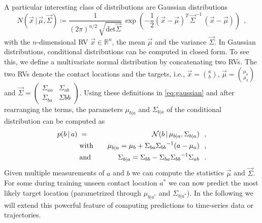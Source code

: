 A particular interesting class of distributions are Gaussian distributions 
\begin{equation}\label{eq:gaussian}
 N(\vec x \, | \, \vec \mu, \vec \Sigma) \coloneqq \frac{1}{{(2\pi)}^{n/2} \, \sqrt{\textrm{det} \vec \Sigma}} \, 
    \exp \left( -\frac{1}{2} (\vec x - \vec \mu)^T \, \vec \Sigma^{-1} \, (\vec x - \vec \mu) \right) ~~,
\end{equation}
 with the $n$-dimensional RV $\vec x \in \mathbb{R}^n$, the mean $\vec \mu$ and the variance $\vec \Sigma$. 
In Gaussian distributions, conditional distributions can be computed in closed form. To see
this, we define a multivariate normal distribution by concatenating two RVs. The two RVs denote the contact locations and the targets, i.e., $\vec x = {a \choose b}$, $\vec \mu =
{\mu_a \choose \mu_b}$ and $\vec \Sigma = \left( \begin{smallmatrix}
\Sigma_{aa}&\Sigma_{ab}\\ \Sigma_{ba}&\Sigma{bb} \end{smallmatrix} \right)$. 
Using these definitions  
in \eqref{eq:gaussian} and after rearranging the terms, the
parameters $\mu_{b|a}$ and $\Sigma_{b|a}$ of the conditional distribution can be computed as 
\begin{eqnarray}\label{eq:general_cond_param}
  p(b \, | \, a) \;&=&\; \mathcal{N}(b \, | \, \mu_{b|a},\Sigma_{b|a}) ~~, \\
   & \text{with} & ~~~ \mu_{b|a}  =  \mu_b + \Sigma_{ba} {\Sigma_{bb}}^{-1} (a - \mu_a) ~~, \nonumber\\
  & \text{and} & ~~~ \Sigma_{b|a} = \Sigma_{bb} - \Sigma_{ba}{\Sigma_{bb}}^{-1}\Sigma_{ab}  ~~. \nonumber
\end{eqnarray}
Given multiple measurements of $a$ and $b$ we can compute the statistics $\vec \mu$ and
$\vec \Sigma$. For some during training unseen contact location $a^*$ we can now
predict the most likely target location (parametrized through $\mu_{b|a^*}$ and
$\Sigma_{b|a^*}$). In the following we will extend this powerful feature of computing predictions to time-series data or trajectories. 

